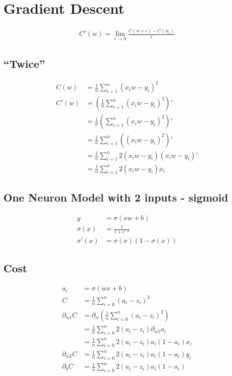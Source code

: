 \documentclass{article}
\begin{document}
\section{Gradient Descent}

\begin{align}
  C'(w) = \lim_{\epsilon \to 0} \frac{C(w + \epsilon) - C(w_i)}{\epsilon}
\end{align}

\subsection{``Twice''}

\begin{align}
  C(w) &= \frac{1}{n}\sum_{i=1}^{n}(x_iw - y_i)^2\\
  C'(w) &= \left(\frac{1}{n}\sum_{i=1}^{n}(x_iw - y_i)^2\right)'\\
       &= \frac{1}{n} \left(\sum_{i=1}^{n}(x_iw - y_i)^2\right)'\\
       &= \frac{1}{n}\sum_{i=1}^{n} \left((x_iw - y_i)^2\right)'\\
       &= \frac{1}{n}\sum_{i=1}^{n}2(x_iw - y_i)\left(x_iw - y_i\right)'\\
       &= \frac{1}{n}\sum_{i=1}^{n}2(x_iw - y_i)x_i
\end{align}

\subsection{One Neuron Model with 2 inputs - sigmoid}

\begin{align}
  y &= \sigma(xw + b) \\
  \sigma(x) &= \frac{1}{1 + e^{-x}} \\
  \sigma'(x) &= \sigma(x)(1 -  \sigma(x))
\end{align}

\subsection{Cost}

\begin{align}
  a_i &= \sigma(wx + b) \\
  C &= \frac{1}{n} \sum_{i=0}^{n}(a_i - z_i)^2 \\
  \partial_{w1}C &= \partial_w\left(\frac{1}{n} \sum_{i=0}^{n}(a_i-z_i)^2 \right) \\
      &= \frac{1}{n} \sum_{i=0}^{n}2(a_i-z_i)\partial_{w1}a_i \\
      &= \frac{1}{n} \sum_{i=0}^{n}2(a_i-z_i)a_i(1-a_i)x_i \\
  \partial_{w2}C&= \frac{1}{n} \sum_{i=0}^{n}2(a_i-z_i)a_i(1-a_i)y_i \\
  \partial_bC &= \frac{1}{n} \sum_{i=0}^{n}2(a_i-z_i)a_i(1-a_i)
\end{align}
\end{document}
